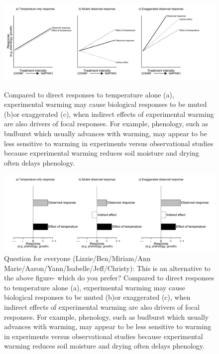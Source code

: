 \documentclass{article}
\begin{document}
 \clearpage
 \begin{figure}[h]
 \centering
 \includegraphics{../Analyses/figures/DirIndWarmingEffects.pdf}  
 \caption{Compared to direct responses to temperature alone (a), experimental warming may cause biological responses to be muted (b)or exaggerated (c), when indirect effects of experimental warming are also drivers of focal responses. For example, phenology, such as budburst which usually advances with warming, may appear to be less sensitive to warming in experiments versus observational studies \citep{wolkovich2012} because experimental warming reduces soil moisture and drying often delays phenology.}
\label{fig:biolimp}
\includegraphics{../Analyses/figures/DirIndWarmingEffects_bar.pdf}   
\caption{Question for everyone (Lizzie/Ben/Miriam/Ann Marie/Aaron/Yann/Isabelle/Jeff/Christy): This is an alternative to the above figure- which do you prefer? Compared to direct responses to temperature alone (a), experimental warming may cause biological responses to be muted (b)or exaggerated (c), when indirect effects of experimental warming are also drivers of focal responses. For example, phenology, such as budburst which usually advances with warming, may appear to be less sensitive to warming in experiments versus observational studies \citep{wolkovich2012} because experimental warming reduces soil moisture and drying often delays phenology.} 
\end{figure}

\end{document}
